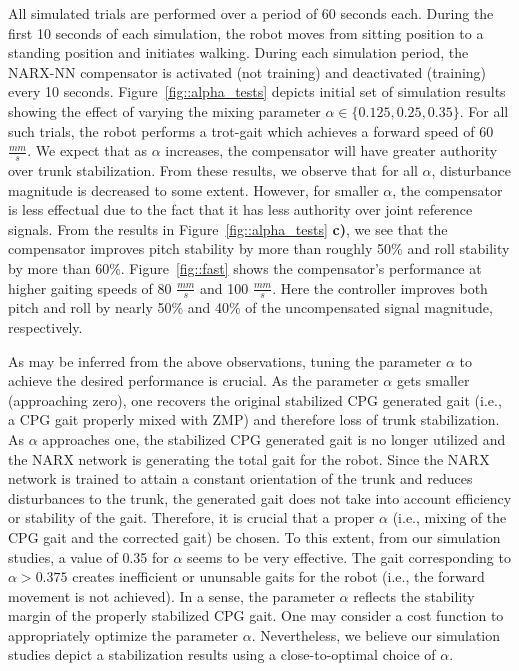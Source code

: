 All simulated trials are performed over a period of 60 seconds each. During the first 10 seconds of each simulation, the robot moves from sitting position to a standing position and initiates walking. During each simulation period, the NARX-NN compensator is activated (not training)  and deactivated (training)  every 10 seconds. Figure~\ref{fig::alpha_tests} depicts initial set of simulation results showing the effect of varying the mixing parameter $\alpha\in\{0.125, 0.25, 0.35\}$. For all such trials, the robot performs a trot-gait which achieves a forward speed of 60 $\frac{mm}{s}$. We expect that as $\alpha$ increases, the compensator will have greater authority over trunk stabilization. From these results, we observe that for all $\alpha$, disturbance magnitude is decreased to some extent. However, for smaller $\alpha$, the compensator is less effectual due to the fact that it has less authority over joint reference signals.  From the results in Figure~\ref{fig::alpha_tests} \textbf{c)}, we see that the compensator improves pitch stability by more than roughly 50\% and roll stability by more than 60\%. Figure~\ref{fig::fast} shows the compensator's performance at higher gaiting speeds of 80 $\frac{mm}{s}$ and 100 $\frac{mm}{s}$. Here the controller improves both pitch and roll by nearly 50\% and 40\% of the  uncompensated signal magnitude, respectively.

As may be inferred from the above observations, tuning the parameter $\alpha$ to achieve the desired performance is crucial. As the parameter $\alpha$ gets smaller (approaching zero), one recovers the original stabilized CPG generated gait (i.e., a CPG gait properly mixed with ZMP) and therefore loss of trunk stabilization. As $\alpha$ approaches one, the stabilized CPG generated gait is no longer utilized and the NARX network is generating the total gait for the robot. Since the NARX network is trained to attain a constant orientation of the trunk and reduces disturbances to the trunk, the generated gait does not take into account efficiency or  stability of the gait. Therefore, it is crucial that a proper $\alpha$ (i.e., mixing of the CPG gait and the corrected gait) be chosen. To this extent, from our simulation studies, a value of 0.35 for $\alpha$ seems to be very effective. The gait corresponding to $\alpha > 0.375$ creates inefficient or ununsable gaits for the robot (i.e., the forward movement is not achieved). In a sense, the parameter $\alpha$ reflects the stability margin of the properly stabilized CPG gait. One may consider a cost function to appropriately optimize the parameter $\alpha$. Nevertheless, we believe our simulation studies depict a stabilization results using a close-to-optimal choice of $\alpha$.

